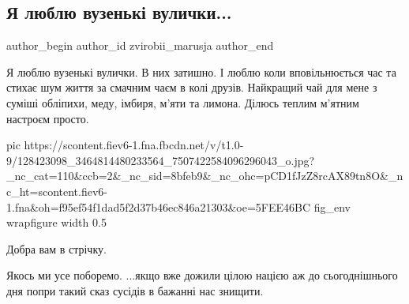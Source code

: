  
 
 
 
 
 
\subsection{Я люблю вузенькі вулички...}
\label{sec:28_11_2020.fb.zvirobii_marusja.1.vuzenki_vyluchky}
\ifcmt
	author_begin
   author_id zvirobii_marusja
	author_end
\fi

Я люблю вузенькі вулички. В них затишно. І люблю коли вповільнюється час та
стихає шум життя за смачним чаєм в колі друзів. Найкращий чай для мене з суміші
обліпихи, меду, імбиря, м'яти та лимона. Ділюсь теплим м'ятним настроєм просто. 

\ifcmt
pic https://scontent.fiev6-1.fna.fbcdn.net/v/t1.0-9/128423098_3464814480233564_7507422584096296043_o.jpg?_nc_cat=110&ccb=2&_nc_sid=8bfeb9&_nc_ohc=pCD1fJzZ8rcAX89tn8O&_nc_ht=scontent.fiev6-1.fna&oh=f95ef54f1dad5f2d37b46ec846a21303&oe=5FEE46BC
fig_env wrapfigure
width 0.5
\fi

Добра вам в стрічку.

Якось ми усе поборемо. ...якщо вже дожили цілою нацією аж до сьогоднішнього дня
попри такий сказ сусідів в бажанні нас знищити.
